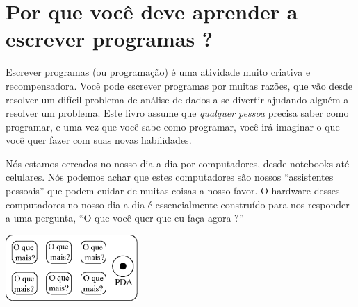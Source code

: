 
\chapter{Por que você deve aprender a escrever programas ?}

Escrever programas (ou programação) é uma atividade
muito criativa e recompensadora. Você pode escrever programas por
muitas razões, que vão desde resolver um difícil problema de
análise de dados a se divertir ajudando alguém a resolver um
problema. Este livro assume que \emph{qualquer pessoa} precisa
saber como programar, e uma vez que você sabe como programar,
você irá imaginar o que você quer fazer com suas novas habilidades.

Nós estamos cercados no nosso dia a dia por computadores, desde
notebooks até celulares. Nós podemos achar que estes computadores
são nossos ``assistentes pessoais'' que podem cuidar de muitas coisas
a nosso favor. O hardware desses computadores no nosso dia a dia é
essencialmente construído para nos responder a uma pergunta,
``O que você quer que eu faça agora ?''

\beforefig
\centerline{\includegraphics[height=1.00in]{figs2/pda.eps}}
\afterfig

